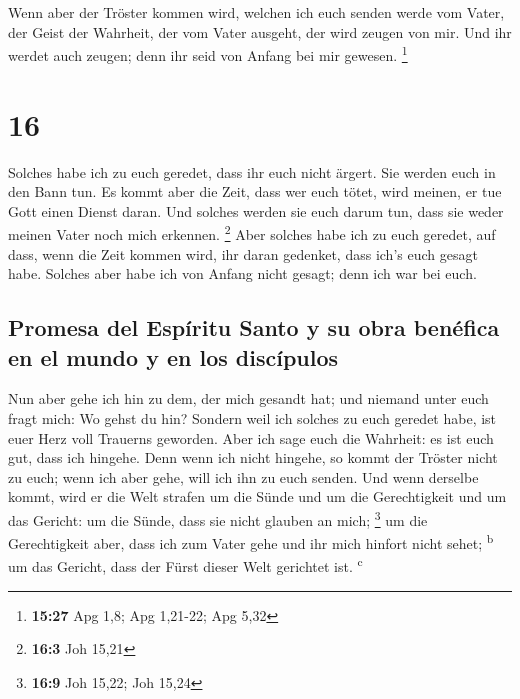  Wenn aber der Tröster kommen wird, welchen ich euch
senden werde vom Vater, der Geist der Wahrheit, der vom Vater ausgeht,
der wird zeugen von mir.  Und ihr werdet auch zeugen;
denn ihr seid von Anfang bei mir gewesen. \footnote{\textbf{15:27} Apg
  1,8; Apg 1,21-22; Apg 5,32}

\hypertarget{section-15}{%
\section{16}\label{section-15}}

 Solches habe ich zu euch geredet, dass ihr euch nicht
ärgert.  Sie werden euch in den Bann tun. Es kommt aber
die Zeit, dass wer euch tötet, wird meinen, er tue Gott einen Dienst
daran.  Und solches werden sie euch darum tun, dass sie
weder meinen Vater noch mich erkennen. \footnote{\textbf{16:3} Joh 15,21}
 Aber solches habe ich zu euch geredet, auf dass, wenn die
Zeit kommen wird, ihr daran gedenket, dass ich's euch gesagt habe.
Solches aber habe ich von Anfang nicht gesagt; denn ich war bei euch.

\hypertarget{promesa-del-espuxedritu-santo-y-su-obra-benuxe9fica-en-el-mundo-y-en-los-discuxedpulos}{%
\subsection{Promesa del Espíritu Santo y su obra benéfica en el mundo y
en los
discípulos}\label{promesa-del-espuxedritu-santo-y-su-obra-benuxe9fica-en-el-mundo-y-en-los-discuxedpulos}}

 Nun aber gehe ich hin zu dem, der mich gesandt hat; und
niemand unter euch fragt mich: Wo gehst du hin?  Sondern
weil ich solches zu euch geredet habe, ist euer Herz voll Trauerns
geworden.  Aber ich sage euch die Wahrheit: es ist euch
gut, dass ich hingehe. Denn wenn ich nicht hingehe, so kommt der Tröster
nicht zu euch; wenn ich aber gehe, will ich ihn zu euch senden.
 Und wenn derselbe kommt, wird er die Welt strafen um die
Sünde und um die Gerechtigkeit und um das Gericht:  um die
Sünde, dass sie nicht glauben an mich; \footnote{\textbf{16:9} Joh
  15,22; Joh 15,24}  um die Gerechtigkeit aber, dass ich
zum Vater gehe und ihr mich hinfort nicht sehet; \textsuperscript{b}
 um das Gericht, dass der Fürst dieser Welt gerichtet
ist. \textsuperscript{c}

